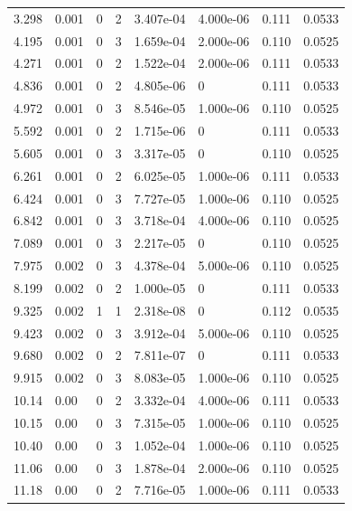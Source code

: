 \documentclass[preview]{standalone}
\begin{document}
{{\begin{tabular}{L{1.2cm}C{1.2cm} C{0.3cm}C{0.5cm} C{1.4cm}C{1.4cm} C{1.4cm}C{1.4cm}}
  3.298  &  0.001  & 0     &  2 &  3.407e-04  & 4.000e-06  & 0.111 &  0.0533   \\ 
  4.195  &  0.001  & 0     &  3 &  1.659e-04  & 2.000e-06  & 0.110 &  0.0525   \\ 
  4.271  &  0.001  & 0     &  2 &  1.522e-04  & 2.000e-06  & 0.111 &  0.0533   \\ 
  4.836  &  0.001  & 0     &  2 &  4.805e-06  & 0  & 0.111 &  0.0533   \\ 
  4.972  &  0.001  & 0     &  3 &  8.546e-05  & 1.000e-06  & 0.110 &  0.0525   \\ 
  5.592  &  0.001  & 0     &  2 &  1.715e-06  & 0  & 0.111 &  0.0533   \\ 
  5.605  &  0.001  & 0     &  3 &  3.317e-05  & 0  & 0.110 &  0.0525   \\ 
  6.261  &  0.001  & 0     &  2 &  6.025e-05  & 1.000e-06  & 0.111 &  0.0533   \\ 
  6.424  &  0.001  & 0     &  3 &  7.727e-05  & 1.000e-06  & 0.110 &  0.0525   \\ 
  6.842  &  0.001  & 0     &  3 &  3.718e-04  & 4.000e-06  & 0.110 &  0.0525   \\ 
  7.089  &  0.001  & 0     &  3 &  2.217e-05  & 0  & 0.110 &  0.0525   \\ 
  7.975  &  0.002  & 0     &  3 &  4.378e-04  & 5.000e-06  & 0.110 &  0.0525   \\ 
  8.199  &  0.002  & 0     &  2 &  1.000e-05  & 0  & 0.111 &  0.0533   \\ 
  9.325  &  0.002  & 1     &  1 &  2.318e-08  & 0  & 0.112 &  0.0535   \\ 
  9.423  &  0.002  & 0     &  3 &  3.912e-04  & 5.000e-06  & 0.110 &  0.0525   \\ 
  9.680  &  0.002  & 0     &  2 &  7.811e-07  & 0  & 0.111 &  0.0533   \\ 
  9.915  &  0.002  & 0     &  3 &  8.083e-05  & 1.000e-06  & 0.110 &  0.0525   \\ 
  10.14  &  0.00  & 0     &  2 &  3.332e-04  & 4.000e-06  & 0.111 &  0.0533   \\ 
  10.15  &  0.00  & 0     &  3 &  7.315e-05  & 1.000e-06  & 0.110 &  0.0525   \\ 
  10.40  &  0.00  & 0     &  3 &  1.052e-04  & 1.000e-06  & 0.110 &  0.0525   \\ 
  11.06  &  0.00  & 0     &  3 &  1.878e-04  & 2.000e-06  & 0.110 &  0.0525   \\ 
  11.18  &  0.00  & 0     &  2 &  7.716e-05  & 1.000e-06  & 0.111 &  0.0533   \\ 

\end{tabular}}}
\end{document}
